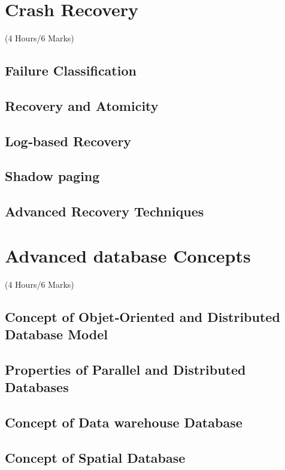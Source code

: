 \documentclass[12pt]{article}
\begin{document}
    \pagebreak
\section{Crash Recovery}
    \begin{center}(4 Hours/6 Marks)\end{center}
    \subsection{Failure Classification}
    \subsection{Recovery and Atomicity}
    \subsection{Log‐based Recovery}
    \subsection{Shadow paging}
    \subsection{Advanced Recovery Techniques}

    \pagebreak
\section{Advanced database Concepts}
    \begin{center}(4 Hours/6 Marks)\end{center}
    \subsection{Concept of Objet‐Oriented and Distributed Database Model}
    \subsection{Properties of Parallel and Distributed Databases}
    \subsection{Concept of Data warehouse Database}
    \subsection{Concept of Spatial Database}
\end{document}
